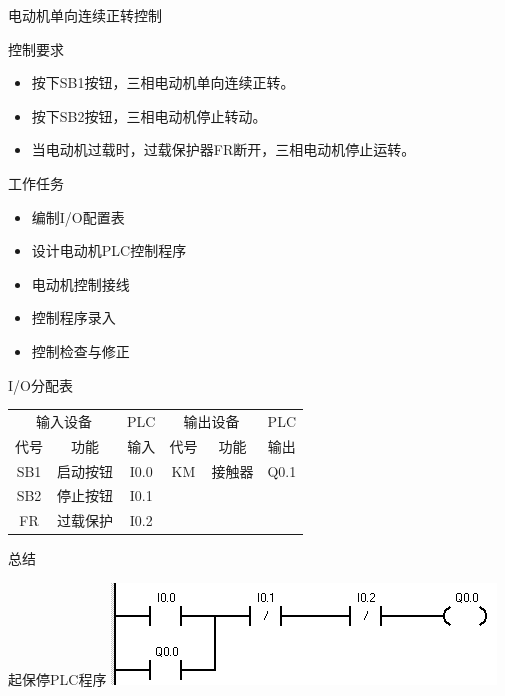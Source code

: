 \begin{frame}[containsverbatim]{电动机单向连续正转控制}
\begin{block}{控制要求}
\begin{itemize}
\item 按下SB1按钮，三相电动机单向连续正转。
\item 按下SB2按钮，三相电动机停止转动。
\item 当电动机过载时，过载保护器FR断开，三相电动机停止运转。
\end{itemize}
\end{block}
\end{frame}
\begin{frame}{}
\begin{block}{工作任务}
\begin{itemize}
\item 编制I/O配置表
\item 设计电动机PLC控制程序
\item 电动机控制接线
\item 控制程序录入
\item 控制检查与修正
\end{itemize}
\end{block}
\end{frame}
\begin{frame}
\begin{block}{I/O分配表}
\begin{small}
\begin{tabular}{|c|c|c|c|c|c|}
\hline 
\multicolumn{2}{|c|}{输入设备} & PLC &\multicolumn{2}{|c|}{输出设备} & PLC \\ 
\cline{1-2}\cline{4-5}
代号 & 功能 & 输入 & 代号 & 功能 & 输出 \\ 
\hline 
SB1 & 启动按钮 & I0.0 & KM & 接触器 & Q0.1 \\ 
\hline 
SB2 & 停止按钮 & I0.1 &  & &  \\ 
\hline 
FR & 过载保护 & I0.2 &  &  &  \\ 
\hline
\end{tabular} 
\end{small}
\end{block}
\end{frame}
\begin{frame}{总结}
\begin{block}{起保停PLC程序}
\includegraphics[scale=0.95]{qibaoting.png}
\end{block}
\end{frame}
\endinput
